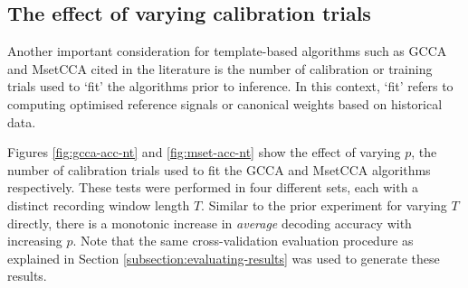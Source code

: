 \subsection{The effect of varying calibration trials}
\label{subsection:decoding-acc-ntr-effect}
Another important consideration for template-based algorithms such as GCCA and MsetCCA cited in the literature is the number of calibration or training trials used to `fit' the algorithms prior to inference. In this context, `fit' refers to computing optimised reference signals or canonical weights based on historical data. 

Figures \ref{fig:gcca-acc-nt} and \ref{fig:mset-acc-nt} show the effect of varying $p$, the number of calibration trials used to fit the GCCA and MsetCCA algorithms respectively. These tests were performed in four different sets, each with a distinct recording window length $T$. Similar to the prior experiment for varying $T$ directly, there is a monotonic increase in \textit{average} decoding accuracy with increasing $p$. Note that the same cross-validation evaluation procedure as explained in Section \ref{subsection:evaluating-results} was used to generate these results.

